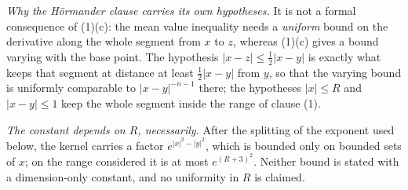 \begin{lemma}
\emph{Why the H\"ormander clause carries its own hypotheses.}  It is not a
formal consequence of (1)(c): the mean value inequality needs a \emph{uniform}
bound on the derivative along the whole segment from $x$ to $z$, whereas (1)(c)
gives a bound varying with the base point.  The hypothesis
$|x-z| \leq \tfrac12|x-y|$ is exactly what keeps that segment at distance at
least $\tfrac12|x-y|$ from $y$, so that the varying bound is uniformly
comparable to $|x-y|^{-n-1}$ there; the hypotheses $|x| \leq R$ and
$|x-y| \leq 1$ keep the whole segment inside the range of clause (1).

\emph{The constant depends on $R$, necessarily.}  After the splitting of the
exponent used below, the kernel carries a factor $e^{|x|^2-|y|^2}$, which is
bounded only on bounded sets of $x$; on the range considered it is at most
$e^{(R+3)^2}$.  Neither bound is stated with a dimension-only constant, and no
uniformity in $R$ is claimed.
\end{lemma}
